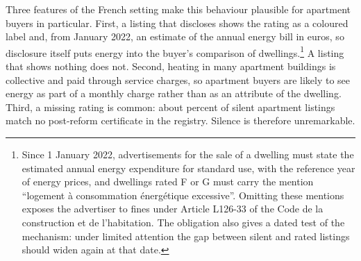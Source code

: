 Three features of the French setting make this behaviour plausible for apartment buyers in particular. First, a listing that discloses shows the rating as a coloured label and, from January 2022, an estimate of the annual energy bill in euros, so disclosure itself puts energy into the buyer's comparison of dwellings.\footnote{Since 1 January 2022, advertisements for the sale of a dwelling must state the estimated annual energy expenditure for standard use, with the reference year of energy prices, and dwellings rated F or G must carry the mention ``logement \`a consommation \'energ\'etique excessive''. Omitting these mentions exposes the advertiser to fines under Article L126-33 of the Code de la construction et de l'habitation. %
The obligation also gives a dated test of the mechanism: under limited attention the gap between silent and rated listings should widen again at that date.} A listing that shows nothing does not. Second, heating in many apartment buildings is collective and paid through service charges, so apartment buyers are likely to see energy as part of a monthly charge rather than as an attribute of the dwelling. Third, a missing rating is common: about \attShareUninfApt{} percent of silent apartment listings match no post-reform certificate in the registry. Silence is therefore unremarkable.

